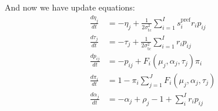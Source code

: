 \documentclass[12pt]{article}
\begin{document}
And now we have update equations: 
\begin{equation}
\begin{aligned}
\frac{d \eta_j}{dt} &= - \eta_j + \frac{1}{2 \sigma_{\text{tc}}^2} \sum_{i=1}^I s_i^{\text{pref}} r_i p_{ij}\\
\frac{d \tau_j}{dt} &= - \tau_j + \frac{1}{2 \sigma_{\text{tc}}^2} \sum_{i=1}^I r_i p_{ij}\\
\frac{d p_{ij}}{dt} &= - p_{ij} + F_i(\mu_j, \alpha_j, \tau_j) \pi_i\\
\frac{d \pi_i}{dt} &= 1 - \pi_i \sum_{j=1}^J F_i(\mu_j, \alpha_j, \tau_j)\\
\frac{d \alpha_j}{dt} &= - \alpha_j + \rho_j - 1 + \sum_i^I r_i p_{ij}\\
\end{aligned}
\end{equation}
\iffalse
(Assume normalization is $\tau$ then we want to normalize all p terms by $\frac{1}{\tau}$. $\tau^{-1} = \prod C^{N_{ij}} = C^{\sum_j N_{ij}} = $ constant)
\fi
\end{document}
